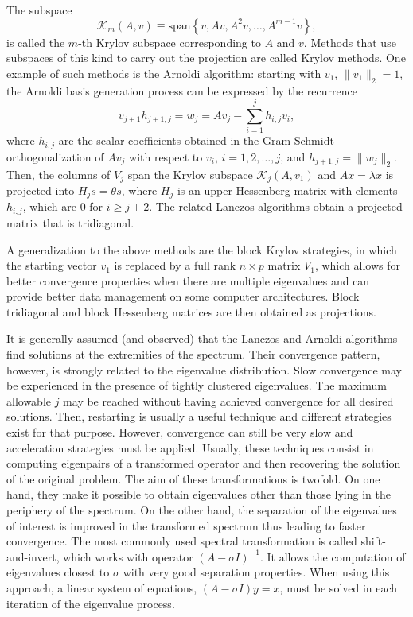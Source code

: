 The subspace
\begin{equation}
\mathcal{K}_m(A,v)\equiv\mathrm{span}\left\{v,Av,A^2v,\ldots,A^{m-1}v\right\},\label{eq:krylov}
\end{equation}
is called the $m$-th Krylov subspace corresponding to $A$ and $v$. Methods that use subspaces of this kind to carry out the projection are called Krylov methods. One example of such methods is the Arnoldi algorithm: starting with $v_1$, $\|v_1\|_2=1$, the Arnoldi basis generation process can be expressed by the recurrence
\begin{equation}
v_{j+1}h_{j+1,j}=w_j=Av_j-\sum_{i=1}^jh_{i,j}v_i,
\end{equation}
where $h_{i,j}$ are the scalar coefficients obtained in the Gram-Schmidt orthogonalization of $Av_j$ with respect to $v_i$, $i=1,2,\ldots,j$, and $h_{j+1,j}=\|w_j\|_2$. Then, the columns of $V_j$ span the Krylov subspace $\mathcal{K}_j(A,v_1)$ and $Ax=\lambda x$ is projected into $H_js=\theta s$, where $H_j$ is an upper Hessenberg matrix with elements $h_{i,j}$, which are 0 for $i\geq j+2$. The related Lanczos algorithms obtain a projected matrix that is tridiagonal.

A generalization to the above methods are the block Krylov strategies, in which the starting vector $v_1$ is replaced by a full rank $n\times p$ matrix $V_1$, which allows for better convergence properties when there are multiple eigenvalues and can provide better data management on some computer architectures. Block tridiagonal and block Hessenberg matrices are then obtained as projections.

It is generally assumed (and observed) that the Lanczos and Arnoldi algorithms find solutions at the extremities of the spectrum. Their convergence pattern, however, is strongly related to the eigenvalue distribution. Slow convergence may be experienced in the presence of tightly clustered eigenvalues. The maximum allowable $j$ may be reached without having achieved convergence for all desired solutions. Then, restarting is usually a useful technique and different strategies exist for that purpose. However, convergence can still be very slow and acceleration strategies must be applied. Usually, these techniques consist in computing eigenpairs of a transformed operator and then recovering the solution of the original problem. The aim of these transformations is twofold. On one hand, they make it possible to obtain eigenvalues other than those lying in the periphery of the spectrum. On the other hand, the separation of the eigenvalues of interest is improved in the transformed spectrum thus leading to faster convergence. The most commonly used spectral transformation is called shift-and-invert, which works with operator $(A-\sigma I)^{-1}$. It allows the computation of eigenvalues closest to $\sigma$ with very good separation properties. When using this approach, a linear system of equations, $(A-\sigma I)y=x$, must be solved in each iteration of the eigenvalue process.

